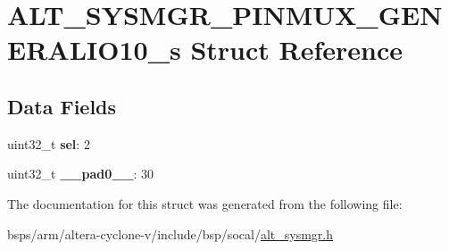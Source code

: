\hypertarget{structALT__SYSMGR__PINMUX__GENERALIO10__s}{}\section{A\+L\+T\+\_\+\+S\+Y\+S\+M\+G\+R\+\_\+\+P\+I\+N\+M\+U\+X\+\_\+\+G\+E\+N\+E\+R\+A\+L\+I\+O10\+\_\+s Struct Reference}
\label{structALT__SYSMGR__PINMUX__GENERALIO10__s}
\subsection*{Data Fields}
\begin{DoxyCompactItemize}
\item 
\mbox{\label{structALT__SYSMGR__PINMUX__GENERALIO10__s_a16077099df812c3d96bb8d800421ead0}} 
uint32\+\_\+t {\bfseries sel}\+: 2
\item 
\mbox{\label{structALT__SYSMGR__PINMUX__GENERALIO10__s_a4b123da57588efc71904ea208dc51a72}} 
uint32\+\_\+t {\bfseries \+\_\+\+\_\+pad0\+\_\+\+\_\+}\+: 30
\end{DoxyCompactItemize}


The documentation for this struct was generated from the following file\+:\begin{DoxyCompactItemize}
\item 
bsps/arm/altera-\/cyclone-\/v/include/bsp/socal/\mbox{\hyperlink{alt__sysmgr_8h}{alt\+\_\+sysmgr.\+h}}\end{DoxyCompactItemize}
